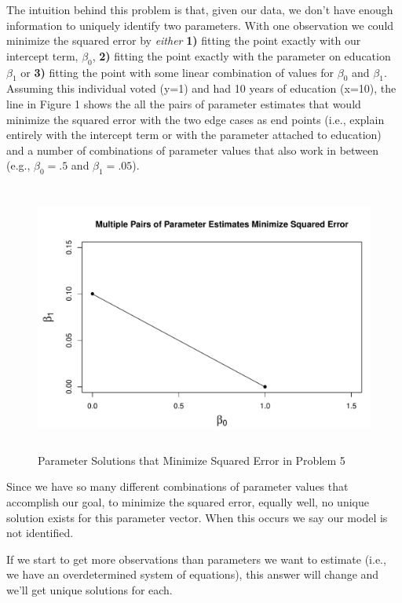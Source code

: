 \documentclass[10pt]{amsart}
\begin{document}
 The intuition behind this problem is that, given our data, we don't have enough information to uniquely identify two parameters. With one observation we could minimize the squared error by \textit{either} \textbf{1)} fitting the point exactly with our intercept term, $\beta_0$,  \textbf{2)} fitting the point exactly with the parameter on education $\beta_1$ or \textbf{3)} fitting the point with some linear combination of values for $\beta_0$ and $\beta_1$. Assuming this individual voted (y=1) and had 10 years of education (x=10), the line in Figure 1 shows the all the pairs of parameter estimates that would minimize the squared error with the two edge cases as end points (i.e., explain entirely with the intercept term or with the parameter attached to education) and a number of combinations of parameter values that also work in between (e.g., $\beta_0 = .5$ and $\beta_1=.05$).  
 
 \begin{figure}[!ht]
\centering
\caption{Parameter Solutions that Minimize Squared Error in Problem 5}
\includegraphics[height=3.5in, width=4.5in]{hw6answers.pdf}
\end{figure}
 
 Since we have so many different combinations of parameter values that accomplish our goal, to minimize the squared error, equally well, no unique solution exists for this parameter vector. When this occurs we say our model is not identified. 
   
If we start to get more observations than parameters we want to estimate (i.e., we have an overdetermined system of equations), this answer will change and we'll get unique solutions for each.\\
 
\end{document}
